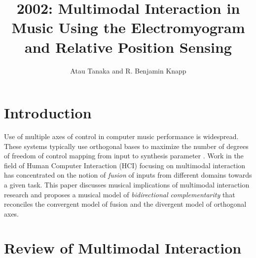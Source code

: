 
\graphicspath{ {mainmatter/Tanaka_2002/} }

\title*{2002: Multimodal Interaction in Music Using the Electromyogram and Relative Position Sensing}

\author{Atau Tanaka and R. Benjamin Knapp}

%
%
\maketitle


\section{Introduction}

Use of multiple axes of control in computer music performance is widespread. These systems typically use orthogonal bases to maximize the number of degrees of freedom of control mapping from input to synthesis parameter \cite{Freed:2000a}. Work in the field of Human Computer Interaction (HCI) focusing on multimodal interaction has concentrated on the notion of \textit{fusion} of inputs from different domains towards a given task. This paper discusses musical implications of multimodal interaction research and proposes a musical model of \textit{bidirectional complementarity} that reconciles the convergent model of fusion and the divergent model of orthogonal axes.

\section{Review of Multimodal Interaction}

